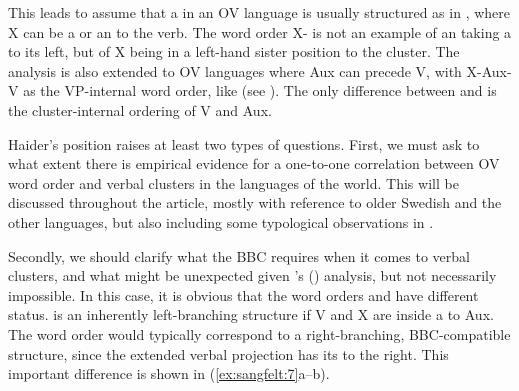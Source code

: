 \documentclass[output=paper, colorlinks, citecolor=brown]{langscibook}
\begin{document}
\z 
\z 

This leads \textcites{Haider2003}[17–18, 335–343]{Haider2010}[90–93, 132–135]{Haider2013} to assume that a  in an OV language is usually structured as in , where X can be a  or an  to the verb. The word order X- is not an example of an  taking a   to its left, but of X being in a left-hand sister position to the cluster. The analysis is also extended to OV languages where Aux can precede V, with X-Aux-V as the VP-internal word order, like  (see \cites[341–343]{Haider2010}[133]{Haider2013}). The only difference between  and  is the cluster-internal ordering of V and Aux.


\ea
\label{ex:sangfelt:6}
 \label{ex:sangfelt:6a}
 \label{ex:sangfelt:6b}
\z
\z 


 Haider’s position raises at least two types of questions. First, we must ask to what extent there is empirical evidence for a one-to-one correlation between OV word order and verbal clusters in the languages of the world. This  will be discussed throughout the article, mostly with reference to older Swedish and the other  languages, but also including some typological observations in .

Secondly, we should clarify what the BBC requires when it comes to verbal clusters, and what might be unexpected given \citeauthor{Haider2010}’s (\citeyear{Haider2010, Haider2013}) analysis, but not necessarily impossible. In this case, it is obvious that the word orders  and  have different status.  is an inherently left-branching structure if V and X are inside a  to Aux. The word order  would typically correspond to a right-branching, BBC-compatible structure, since the extended verbal projection has its  to the right. This important difference is shown in (\ref{ex:sangfelt:7}a–b).
\end{document}
